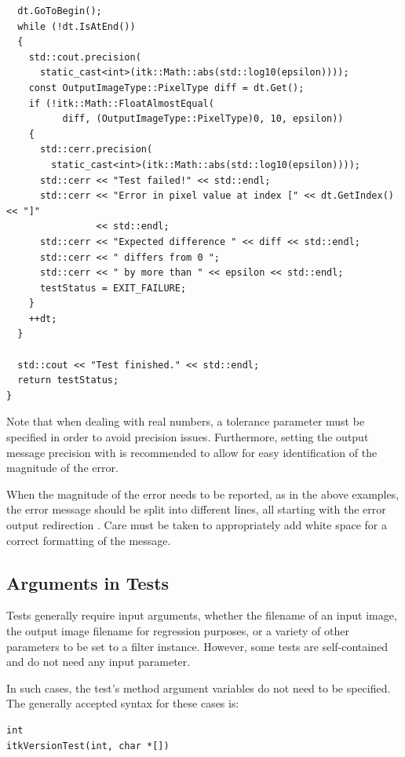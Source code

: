\begin{verbatim}
  dt.GoToBegin();
  while (!dt.IsAtEnd())
  {
    std::cout.precision(
      static_cast<int>(itk::Math::abs(std::log10(epsilon))));
    const OutputImageType::PixelType diff = dt.Get();
    if (!itk::Math::FloatAlmostEqual(
          diff, (OutputImageType::PixelType)0, 10, epsilon))
    {
      std::cerr.precision(
        static_cast<int>(itk::Math::abs(std::log10(epsilon))));
      std::cerr << "Test failed!" << std::endl;
      std::cerr << "Error in pixel value at index [" << dt.GetIndex() << "]"
                << std::endl;
      std::cerr << "Expected difference " << diff << std::endl;
      std::cerr << " differs from 0 ";
      std::cerr << " by more than " << epsilon << std::endl;
      testStatus = EXIT_FAILURE;
    }
    ++dt;
  }

  std::cout << "Test finished." << std::endl;
  return testStatus;
}
\end{verbatim}
\normalsize

Note that when dealing with real numbers, a tolerance parameter must be
specified in order to avoid precision issues. Furthermore, setting the output
message precision with  is recommended to
allow for easy identification of the magnitude of the error.

When the magnitude of the error needs to be reported, as in the above examples,
the error message should be split into different lines, all starting with the
error output redirection . Care must be taken to
appropriately add white space for a correct formatting of the message.


\subsection{Arguments in Tests}%
\label{subsec:ArgumentsInTests}

Tests generally require input arguments, whether the filename of an input image,
the output image filename for regression purposes, or a variety of other
parameters to be set to a filter instance. However, some tests are
self-contained and do not need any input parameter.

In such cases, the test's  method argument variables do not need to
be specified. The generally accepted syntax for these cases is:

\small
\begin{verbatim}
int
itkVersionTest(int, char *[])
\end{verbatim}
\normalsize

